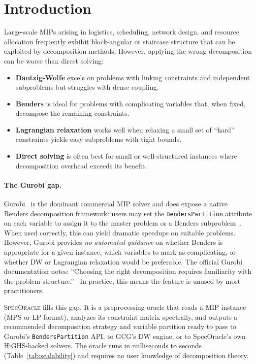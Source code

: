 \documentclass[11pt]{article}
\begin{document}
\section{Introduction}
\label{sec:intro}

Large-scale MIPs arising in logistics, scheduling, network design, and resource allocation frequently exhibit block-angular or staircase structure that can be exploited by decomposition methods. However, applying the wrong decomposition can be worse than direct solving:

\begin{itemize}[leftmargin=*]
\item \textbf{Dantzig-Wolfe} excels on problems with linking constraints and independent subproblems but struggles with dense coupling.
\item \textbf{Benders} is ideal for problems with complicating variables that, when fixed, decompose the remaining constraints.
\item \textbf{Lagrangian relaxation} works well when relaxing a small set of ``hard'' constraints yields easy subproblems with tight bounds.
\item \textbf{Direct solving} is often best for small or well-structured instances where decomposition overhead exceeds its benefit.
\end{itemize}

\paragraph{The Gurobi gap.}
Gurobi~\cite{gurobi} is the dominant commercial MIP solver and does expose a native Benders decomposition framework: users may set the \texttt{BendersPartition} attribute on each variable to assign it to the master problem or a Benders subproblem~\cite{gurobi-benders}. When used correctly, this can yield dramatic speedups on suitable problems. However, Gurobi provides \emph{no automated guidance} on whether Benders is appropriate for a given instance, which variables to mark as complicating, or whether DW or Lagrangian relaxation would be preferable. The official Gurobi documentation notes: ``Choosing the right decomposition requires familiarity with the problem structure.''~\cite{gurobi-benders} In practice, this means the feature is unused by most practitioners.

\textsc{SpecOracle} fills this gap. It is a preprocessing oracle that reads a MIP instance (MPS or LP format), analyzes its constraint matrix spectrally, and outputs a recommended decomposition strategy and variable partition ready to pass to Gurobi's \texttt{BendersPartition} API, to GCG's DW engine, or to SpecOracle's own HiGHS-backed solvers. The oracle runs in milliseconds to seconds (Table~\ref{tab:scalability}) and requires no user knowledge of decomposition theory.
\end{document}
